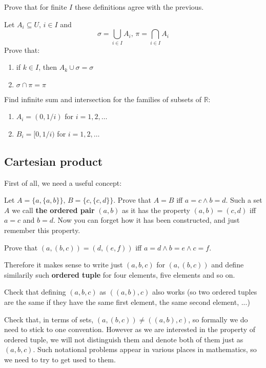 \begin{prob}
	Prove that for finite $I$ these definitions agree with the previous.
\end{prob}

\begin{prob} Let $A_i\subseteq U,\, i\in I$ and 
	$$\sigma = \bigcup_{i\in I}A_i,\, \pi = \bigcap_{i\in I}A_i$$
	Prove that:
	\begin{enumerate}
		\item if $k\in I$, then $A_k\cup \sigma=\sigma$
		\item $\sigma\cap \pi = \pi$
	\end{enumerate}
\end{prob}

\begin{prob} Find infinite sum and intersection for the families of subsets of $\mathbb{R}$:
	\begin{enumerate}
		\item $A_i=(0,1/i)$ for $i=1,2,\dots$
		\item $B_i=[0,1/i)$ for $i=1,2,\dots$
	\end{enumerate}
\end{prob}

\subsection{Cartesian product}
First of all, we need a useful concept:
\begin{prob}
Let $A=\{a, \{a,b\}\},\, B=\{c,\{c,d\}\}$. Prove that $A=B$ iff $a=c\wedge b=d$. Such a set $A$ we call
\textbf{the ordered pair} $(a,b)$ as it has the property $(a,b)=(c,d)$ iff $a=c$ and $b=d$. 
Now you can forget how it has been constructed, and just remember this property.
\end{prob}

\begin{prob}
Prove that $(a,(b,c))=(d,(e,f))$ iff $a=d\wedge b=e\wedge c=f$.
\end{prob}
\noindent Therefore it makes sense to write just
$(a,b,c)$ for $(a,(b,c))$ and define similarily such \textbf{ordered tuple} for four elements, five elements
and so on.
\begin{prob}
Check that defining $(a,b,c)$ as $((a,b),c)$ also works (so two ordered tuples are the same if they have the
same first element, the same second element, ...)
\end{prob}
\begin{prob}
Check that, in terms of sets, $(a,(b,c))\neq ((a,b),c)$, so formally we do need to stick to one convention. 
However as we are interested in the property of ordered tuple, we will not distinguish them and denote both
of them just as $(a,b,c)$. Such notational problems appear in various places in mathematics, so we need to
try to get used to them.
\end{prob}

